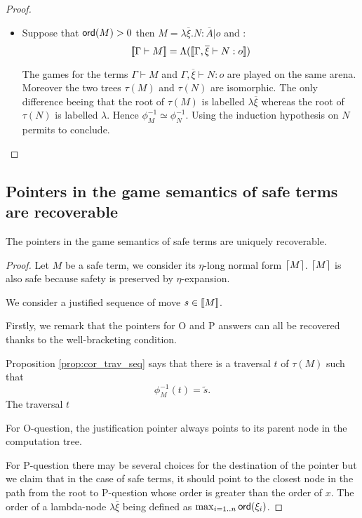\begin{proof}
\begin{itemize}

    \item Suppose that ${\sf ord}(M) > 0$ then $M = \lambda \overline{\xi} . N : \overline{A}|o$ and :
    $$ {[\![ \Gamma \vdash M ]\!]} = \Lambda( {[\![ \Gamma,\overline{\xi} \vdash N: o ]\!]} )$$

    The games for the terms $ \Gamma \vdash M$ and $\Gamma,\overline{\xi} \vdash N: o$
    are played on the same arena. Moreover the two trees $\tau(M)$ and $\tau(N)$ are
    isomorphic. The only difference beeing that the root of
    $\tau(M)$ is labelled $\lambda \overline{\xi}$ whereas the root
    of $\tau(N)$ is labelled $\lambda$. Hence $\phi^{-1}_M  \simeq
    \phi^{-1}_N$.
    Using the induction hypothesis on $N$ permits to conclude.

\end{itemize}

\end{proof}

\subsection{Pointers in the game semantics of safe terms are recoverable}

\begin{prop}
The pointers in the game semantics of safe terms are
uniquely recoverable.
\end{prop}

\begin{proof}
Let $M$ be a safe term, we consider its $\eta$-long normal form $\lceil M\rceil$.
$\lceil M\rceil$ is also safe because safety is preserved by $\eta$-expansion.

We consider a justified sequence of move $s \in {[\![M ]\!]}$.

Firstly, we remark that the pointers for O and P answers can all be
recovered thanks to the well-bracketing condition.

Proposition \ref{prop:cor_trav_seq} says that there is a traversal $t$ of $\tau(M)$ such that
$$\phi^{-1}_{M}(t) = \tilde{s}.$$
The traversal $t$


For O-question, the justification pointer always points to its
parent node in the computation tree.

For P-question there may be several choices for the destination of
the pointer but we claim that in the case of safe terms, it should
point to the closest node in the path from the root to P-question
whose order is greater than the order of $x$. The order of a
lambda-node $\lambda \overline{\xi}$ being defined as $\max_{i=1..n}
{\sf ord}(\xi_i)$.



\end{proof}
